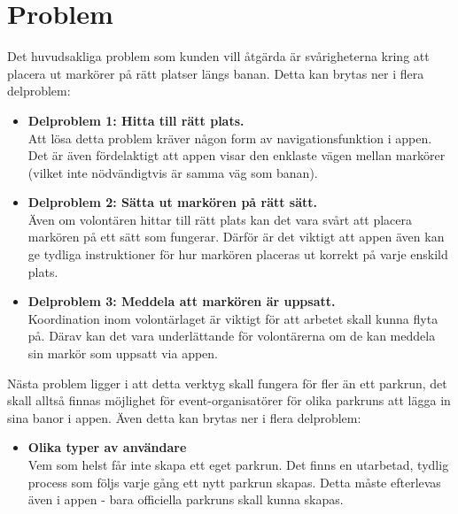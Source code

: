 \section{Problem}
Det huvudsakliga problem som kunden vill åtgärda är svårigheterna kring att placera ut markörer på rätt platser längs banan. Detta kan brytas ner i flera delproblem:
\begin{itemize}
    \item \textbf{Delproblem 1: Hitta till rätt plats.}\\
        Att lösa detta problem kräver någon form av navigationsfunktion i appen. Det är även fördelaktigt att appen visar den enklaste vägen mellan markörer (vilket inte nödvändigtvis är samma väg som banan).  
    \item \textbf{Delproblem 2: Sätta ut markören på rätt sätt.}\\
        Även om volontären hittar till rätt plats kan det vara svårt att placera markören på ett sätt som fungerar. Därför är det viktigt att appen även kan ge tydliga instruktioner för hur markören placeras ut korrekt på varje enskild plats. 
    \item \textbf{Delproblem 3: Meddela att markören är uppsatt.}\\
        Koordination inom volontärlaget är viktigt för att arbetet skall kunna flyta på. Därav kan det vara underlättande för volontärerna om de kan meddela sin markör som uppsatt via appen.
\end{itemize}
Nästa problem ligger i att detta verktyg skall fungera för fler än ett parkrun, det skall alltså finnas möjlighet för event-organisatörer för olika parkruns att lägga in sina banor i appen. Även detta kan brytas ner i flera delproblem:
\begin{itemize}
    \item \textbf{Olika typer av användare}\\
        Vem som helst får inte skapa ett eget parkrun. Det finns en utarbetad, tydlig process som följs varje gång ett nytt parkrun skapas. Detta måste efterlevas även i appen - bara officiella parkruns skall kunna skapas. 

\end{itemize}